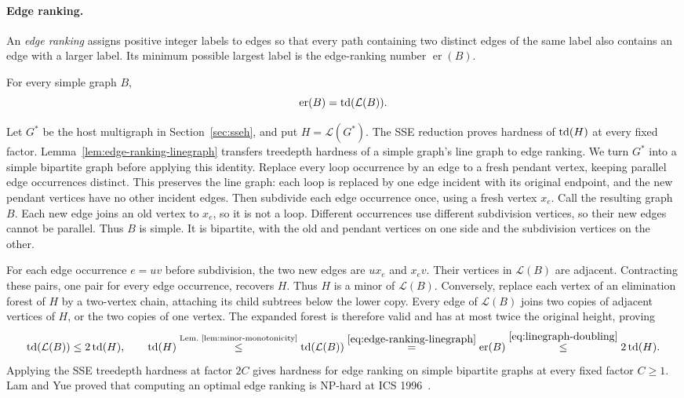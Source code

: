 \paragraph{Edge ranking.}
An \emph{edge ranking} assigns positive integer labels to edges
so that every path containing two distinct edges of the same
label also contains an edge with a larger label. Its minimum
possible largest label is the edge-ranking number
$\operatorname{er}(B)$.
\begin{lemma}
\label{lem:edge-ranking-linegraph}
For every simple graph $B$,
\begin{equation}\label{eq:edge-ranking-linegraph}
 \operatorname{er}(B)=\operatorname{td}(\mathcal L(B)).
\end{equation}
\end{lemma}

Let $G^*$ be the host multigraph in Section~\ref{sec:sseh}, and put
$H=\mathcal L(G^*)$. The SSE reduction proves hardness of
$\operatorname{td}(H)$ at every fixed factor.
Lemma~\ref{lem:edge-ranking-linegraph} transfers treedepth hardness
of a simple graph's line graph to edge ranking.
We turn $G^*$ into a simple bipartite graph before applying this
identity. Replace every loop occurrence by an edge to a fresh pendant
vertex, keeping parallel edge occurrences distinct. This preserves
the line graph: each loop is replaced by one edge incident with its
original endpoint, and the new pendant vertices have no other
incident edges. Then subdivide each edge occurrence once, using a
fresh vertex $x_e$. Call the resulting graph $B$. Each new edge joins
an old vertex to $x_e$, so it is not a loop. Different occurrences
use different subdivision vertices, so their new edges cannot be
parallel. Thus $B$ is simple. It is bipartite,
with the old and pendant vertices on one side and the subdivision
vertices on the other.

For each edge occurrence $e=uv$ before subdivision, the two new
edges are $ux_e$ and $x_ev$. Their vertices in $\mathcal L(B)$ are
adjacent. Contracting these pairs, one pair for every edge occurrence,
recovers $H$. Thus $H$ is a minor of $\mathcal L(B)$.
Conversely, replace each vertex of
an elimination forest of $H$ by a two-vertex chain, attaching its
child subtrees below the lower copy. Every edge of $\mathcal L(B)$
joins two copies of adjacent vertices of $H$, or the two copies of
one vertex. The expanded forest is therefore valid and has at most
twice the original height, proving
\begin{equation}\label{eq:linegraph-doubling}
 \operatorname{td}(\mathcal L(B))\leq2\operatorname{td}(H),\qquad
 \operatorname{td}(H)\overset{\text{Lem.~\ref{lem:minor-monotonicity}}}{\leq}\operatorname{td}(\mathcal L(B))
 \overset{\eqref{eq:edge-ranking-linegraph}}{=}\operatorname{er}(B)
 \overset{\eqref{eq:linegraph-doubling}}{\leq}2\operatorname{td}(H).
\end{equation}
Applying the SSE
treedepth hardness at factor $2C$ gives hardness for edge ranking on
simple bipartite graphs at every fixed factor $C\geq1$.
Lam and Yue proved that computing an optimal edge ranking is NP-hard
at ICS 1996~\cite{LamYue1996}.

